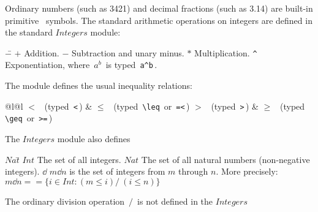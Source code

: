 \documentclass[fleqn,leqno]{article}
\begin{document}
Ordinary 
numbers (such as 3421) and 
decimal fractions (such as 3.14) are
built-in primitive \tlaplus\ symbols.  The standard arithmetic
operations on integers are defined in the standard 
$Integers$ module:
\begin{display}
\begin{tabbing}
$-$\=\kill
$+$ \> Addition. 
%
$-$ \> Subtraction and unary minus. 
%
$*$ \>
Multiplication. 
\verb|^| \>
Exponentiation, where \,$a^{b}$\, is typed 
\,\verb|a^b|\,.

\end{tabbing}
\end{display}
The 
module defines the usual inequality relations: 
\begin{display}
\begin{tabular}{@{}l@{\hspace{2em}}l}
  $<$ \ (typed \,\verb|<|\,) &
%
$\leq$ \ (typed \,\verb|\leq|\, or \,\verb|=<|\,) 
%
$>$  \ (typed \,\verb|>|\,) &
$\geq$ \ (typed
\,\verb|\geq|\, or \,\verb|>=|\,)
\end{tabular}
\end{display}
The $Integers$ module also defines 
\begin{display}
\begin{tabbing}
$Nat$\= \kill
{}%
$Int$ \> The set of all
integers.
%
$Nat$ \> The set of all natural numbers (non-negative integers). 
%
$\dd$ \> $m\dd n$ is the set of integers from $m$ through $n$.  
   More precisely:\\
\> $m\dd n == \{i \in Int : (m \leq i) /\ (i \leq n)\}$
\end{tabbing}
\end{display}
The ordinary division operation 
\,$/$\, is not defined in the $Integers$
\end{document}
